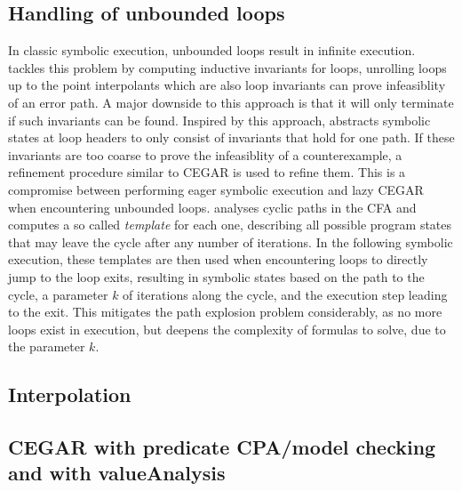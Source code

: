 \subsection*{Handling of unbounded loops}
In classic symbolic execution, unbounded loops result in infinite execution.
\cite{McMillan2010} tackles this problem by computing inductive invariants for loops, unrolling loops up to the point interpolants which are also loop invariants can prove infeasiblity of an error path.
A major downside to this approach is that it will only terminate if such invariants can be found.
Inspired by this approach, \cite{Jaffar2012} abstracts symbolic states at loop headers to only consist of invariants that hold for one path.
If these invariants are too coarse to prove the infeasiblity of a counterexample, a refinement procedure similar to CEGAR is used to refine them.
This is a compromise between performing eager symbolic execution and lazy CEGAR when encountering unbounded loops.
\cite{Slaby2013} analyses cyclic paths in the CFA and computes a so called \emph{template} for each one,
describing all possible program states that may leave the cycle after any number of iterations.
In the following symbolic execution, these templates are then used when encountering loops to directly jump to the loop exits, resulting in symbolic states based on the path to the cycle, a parameter $k$ of iterations along the cycle, and the execution step leading to the exit.
This mitigates the path explosion problem considerably, as no more loops exist in execution, but deepens the complexity of formulas to solve, due to the parameter $k$.

\subsection*{Interpolation}


\subsection*{CEGAR with predicate CPA/model checking and with valueAnalysis}
